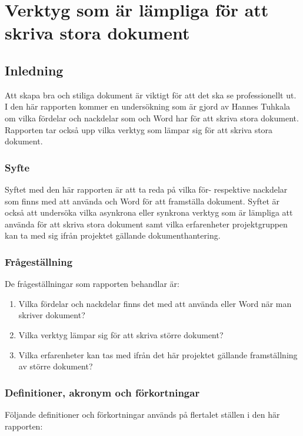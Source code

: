\chapter{Verktyg som är lämpliga för att skriva stora dokument}
\label{cha:indiv-report-tuhkala}

\section{Inledning}
\label{sec:introduction-tuhkala}
Att skapa bra och stiliga dokument är viktigt för att det ska se professionellt ut. I den här rapporten kommer en undersökning som är gjord av Hannes Tuhkala om vilka fördelar och nackdelar som \latex och Word har för att skriva stora dokument. Rapporten tar också upp vilka verktyg som lämpar sig för att skriva stora dokument.

\subsection{Syfte}
\label{sec:purpose-tuhkala}
Syftet med den här rapporten är att ta reda på vilka för- respektive nackdelar som finns med att använda \latex och Word för att framställa dokument. Syftet är också att undersöka vilka asynkrona eller synkrona verktyg som är lämpliga att använda för att skriva stora dokument samt vilka erfarenheter projektgruppen kan ta med sig ifrån projektet gällande dokumenthantering.

\subsection{Frågeställning}
\label{sec:issue-tuhkala}
De frågeställningar som rapporten behandlar är:

\begin{enumerate}
	\item Vilka fördelar och nackdelar finns det med att använda \latex eller Word när man skriver dokument?
	\item Vilka verktyg lämpar sig för att skriva större dokument?
	\item Vilka erfarenheter kan tas med ifrån det här projektet gällande framställning av större dokument?
\end{enumerate}

\subsection{Definitioner, akronym och förkortningar}
Följande definitioner och förkortningar används på flertalet ställen i den här rapporten:

